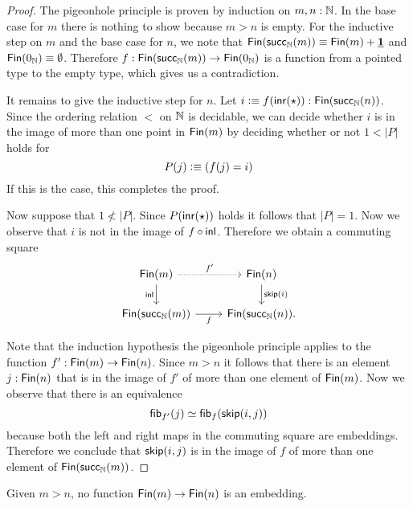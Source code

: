 \begin{proof}
  The pigeonhole principle is proven by induction on $m,n:{\mathbb{N}}$. In the base case for $m$ there is nothing to show because $m>n$ is empty. For the inductive step on $m$ and the base case for $n$, we note that $\mathsf{Fin}(\mathsf{succ}_{{\mathbb{N}}}(m))\equiv \mathsf{Fin}(m)+\underline{\mathbf{1}}$ and $\mathsf{Fin}(0_{{\mathbb{N}}})\equiv \emptyset$. Therefore $f:\mathsf{Fin}(\mathsf{succ}_{{\mathbb{N}}}(m))\to\mathsf{Fin}(0_{{\mathbb{N}}})$ is a function from a pointed type to the empty type, which gives us a contradiction.

  It remains to give the inductive step for $n$. Let $i\vcentcolon\equiv f({\mathsf{inr}}(\star)):\mathsf{Fin}(\mathsf{succ}_{{\mathbb{N}}}(n))$. Since the ordering relation $<$ on ${\mathbb{N}}$ is decidable, we can decide whether $i$ is in the image of more than one point in $\mathsf{Fin}(m)$ by deciding whether or not $1<|P|$ holds for
  \begin{equation*}
    P(j)\vcentcolon\equiv (f(j)=i)
  \end{equation*}
  If this is the case, this completes the proof.

  Now suppose that $1\not<|P|$. Since $P({\mathsf{inr}}(\star))$ holds it follows that $|P|=1$. Now we observe that $i$ is not in the image of $f\circ {\mathsf{inl}}$. Therefore we obtain a commuting square
  \begin{equation*}
    \begin{tikzcd}
      \Fin(m) \arrow[r,densely dotted,"{f'}"] \arrow[d,swap,"\inl"] & \Fin(n) \arrow[d,"{\skipfun(i)}"] \\
      \Fin(\succN(m)) \arrow[r,swap,"f"] & \Fin(\succN(n)).
    \end{tikzcd}
  \end{equation*}

  Note that the induction hypothesis the pigeonhole principle applies to the function $f':\mathsf{Fin}(m)\to\mathsf{Fin}(n)$. Since $m>n$ it follows that there is an element $j:\mathsf{Fin}(n)$ that is in the image of $f'$ of more than one element of $\mathsf{Fin}(m)$. Now we observe that there is an equivalence
  \begin{equation*}
    \mathsf{fib}_{f'}(j)\simeq \mathsf{fib}_{f}(\mathsf{skip}(i,j))
  \end{equation*}
  because both the left and right maps in the commuting square are embeddings. Therefore we conclude that $\mathsf{skip}(i,j)$ is in the image of $f$ of more than one element of $\mathsf{Fin}(\mathsf{succ}_{{\mathbb{N}}}(m))$. 
 \end{proof}

\begin{cor}\label{cor:pigeonhole}
  Given $m>n$, no function $\mathsf{Fin}(m)\to\mathsf{Fin}(n)$ is an embedding.
\end{cor}


